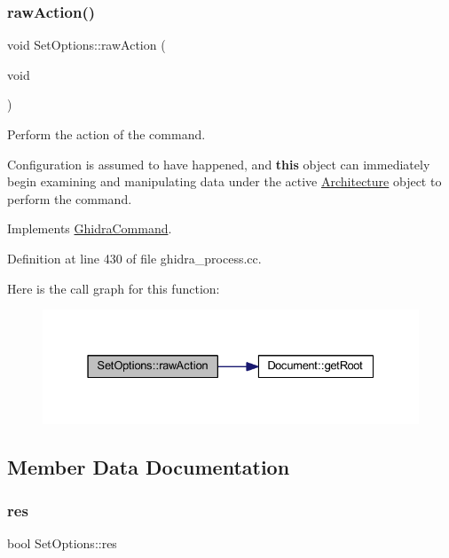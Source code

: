 \subsubsection{\texorpdfstring{rawAction()}{rawAction()}}
{\footnotesize\ttfamily void Set\+Options\+::raw\+Action (\begin{DoxyParamCaption}\item[{void}]{ }\end{DoxyParamCaption})\hspace{0.3cm}{\ttfamily [virtual]}}



Perform the action of the command. 

Configuration is assumed to have happened, and {\bfseries{this}} object can immediately begin examining and manipulating data under the active \mbox{\hyperlink{class_architecture}{Architecture}} object to perform the command. 

Implements \mbox{\hyperlink{class_ghidra_command_a7d1a5cfedfd8f1d05161d27627302716}{Ghidra\+Command}}.



Definition at line 430 of file ghidra\+\_\+process.\+cc.

Here is the call graph for this function\+:
\nopagebreak
\begin{figure}[H]
\begin{center}
\leavevmode
\includegraphics[width=331pt]{class_set_options_a1e73126b79340651e9fa9cfc47e80649_cgraph}
\end{center}
\end{figure}


\subsection{Member Data Documentation}
\mbox{\label{class_set_options_aed159d40f964c60e9983bbfac3787c76}} 
\subsubsection{\texorpdfstring{res}{res}}
{\footnotesize\ttfamily bool Set\+Options\+::res}



